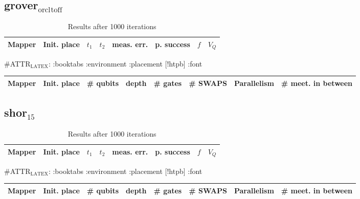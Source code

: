 \documentclass[11pt]{article}
\begin{document}
\subsection{grover\(_{\text{orcl}}\)\(_{\text{toff}}\)}
\label{sec:org834c3c7}
\begin{table}[!htpb]
\caption{\label{tab:org5139388}
Results after 1000 iterations}
\centering
\begin{tabular}{llllllll}
\hline
Mapper & Init. place & \(t_1\) & \(t_2\) & meas. err. & p. success & \(f\) & \(V_Q\)\\
\hline
\end{tabular}
\end{table}

\#ATTR\(_{\text{LATEX}}\): :booktabs :environment :placement [!htpb] :font \small
\begin{center}
\begin{tabular}{llllllll}
\hline
Mapper & Init. place & \# qubits & depth & \# gates & \# SWAPS & Parallelism & \# meet. in between\\
\hline
\end{tabular}
\end{center}
\subsection{shor\(_{\text{15}}\)}
\label{sec:org5305af2}
\begin{table}[!htpb]
\caption{\label{tab:orgfb6c759}
Results after 1000 iterations}
\centering
\begin{tabular}{llllllll}
\hline
Mapper & Init. place & \(t_1\) & \(t_2\) & meas. err. & p. success & \(f\) & \(V_Q\)\\
\hline
\end{tabular}
\end{table}

\#ATTR\(_{\text{LATEX}}\): :booktabs :environment :placement [!htpb] :font \small
\begin{center}
\begin{tabular}{llllllll}
\hline
Mapper & Init. place & \# qubits & depth & \# gates & \# SWAPS & Parallelism & \# meet. in between\\
\hline
\end{tabular}
\end{center}
\end{document}
